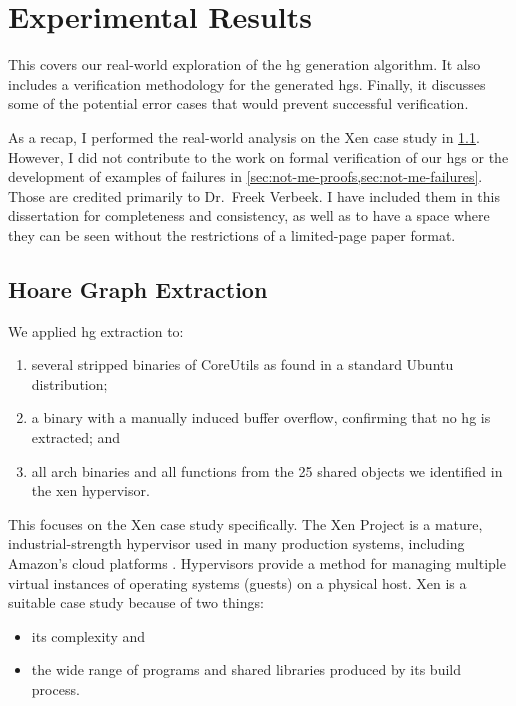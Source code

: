 \chapter{Experimental Results}\label{ch:hg-results}
This  covers our real-world exploration of the \ac{hg} generation algorithm.
It also includes a verification methodology for the generated \acp{hg}.
Finally, it discusses some of the potential error cases that would prevent successful verification.

As a recap, I performed the real-world analysis on the Xen case study in \cref{hg-extraction}.
However, I did not contribute to the work on formal verification of our \acp{hg} or the development of examples of failures in \cref{sec:not-me-proofs,sec:not-me-failures}.
Those  are credited primarily to Dr.~Freek Verbeek.
I have included them in this dissertation for completeness and consistency, as well as to have a space where they can be seen without the restrictions of a limited-page paper format.

\section{Hoare Graph Extraction}\label{hg-extraction}
We applied \ac{hg} extraction to:
\begin{enumerate}
  \item several stripped binaries of CoreUtils as found in a standard Ubuntu distribution;
  \item a binary with a manually induced buffer overflow, confirming that no \ac{hg} is extracted; and
  \item all  \gls{arch} binaries and all  functions from the 25 shared objects we identified in the \gls{xen} hypervisor.
\end{enumerate}
This  focuses on the Xen case study specifically.
The Xen Project is a mature, industrial-strength hypervisor used in many production systems, including Amazon's cloud platforms \autocite{chisnall2008definitive}.
Hypervisors provide a method for managing multiple virtual instances of operating systems (guests) on a physical host.
Xen is a suitable case study because of two things:
\begin{itemize}
  \item its complexity and
  \item the wide range of programs and shared libraries produced by its build process.
\end{itemize}

